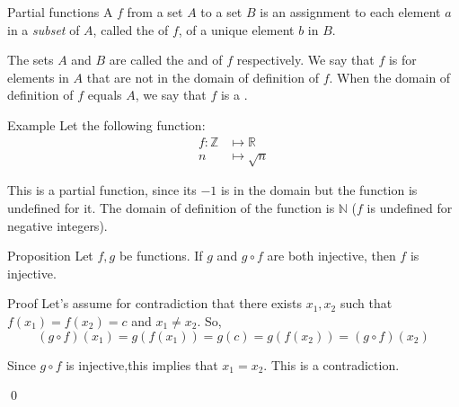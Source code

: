 \documentclass[a4paper]{article}
\begin{document}
\begin{parag}{Partial functions}
    A  $f$ from a set $A$ to a set $B$ is an assignment to each element $a$ in a \textit{subset} of $A$, called the  of $f$, of a unique element $b$ in $B$.

    The sets $A$ and $B$ are called the  and  of $f$ respectively. We say that $f$ is  for elements in $A$ that are not in the domain of definition of $f$. When the domain of definition of $f$ equals $A$, we say that $f$ is a .

    \begin{subparag}{Example}
        Let the following function:
        \[\begin{split}
        f: \mathbb{Z} &\longmapsto \mathbb{R} \\
        n &\longmapsto \sqrt{n}
        \end{split}\]
        
        This is a partial function, since its $-1$ is in the domain but the function is undefined for it. The domain of definition of the function is $\mathbb{N}$ ($f$ is undefined for negative integers).
    \end{subparag}
\end{parag}

\begin{parag}{Proposition}
    Let $f, g$ be functions. If $g$ and $g \circ f$ are both injective, then $f$ is injective.

    \begin{subparag}{Proof}
        Let's assume for contradiction that there exists $x_1, x_2$ such that $f\left(x_1\right) = f\left(x_2\right) = c$ and $x_1 \neq x_2$. So, 
        \[\left(g \circ f\right)\left(x_1\right) = g\left(f\left(x_1\right)\right) = g\left(c\right) = g\left(f\left(x_2\right)\right) = \left(g \circ f\right)\left(x_2\right)\]
        
        Since $g \circ f$ is injective,this implies that $x_1 = x_2$. This is a contradiction.

        \qed
    \end{subparag}
\end{parag}
\end{document}
